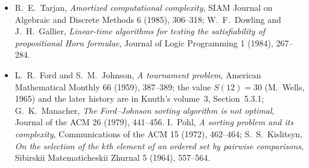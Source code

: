 \begin{itemize}
source of our presentation of the master theorem and of the dynamic array.
\item R.~E.~Tarjan, \emph{Amortized computational complexity}, SIAM Journal on Algebraic and Discrete Methods 6 (1985), 306--318;
W.~F.~Dowling and J.~H.~Gallier, \emph{Linear-time algorithms for testing the satisfiability of propositional Horn formulae}, Journal of Logic
Programming 1 (1984), 267--284.
\item L.~R.~Ford and S.~M.~Johnson, \emph{A tournament problem}, American Mathematical Monthly 66 (1959), 387--389; the value $S(12)=30$ (M.~Wells, 1965)
and the later history are in Knuth's volume~3, Section~5.3.1; G.~K.~Manacher, \emph{The Ford--Johnson sorting algorithm is not optimal},
Journal of the ACM 26 (1979), 441--456. I.~Pohl, \emph{A sorting problem and its complexity}, Communications of the ACM 15 (1972), 462--464;
S.~S.~Kislitsyn, \emph{On the selection of the $k$th element of an ordered set by pairwise comparisons}, Sibirskii Matematicheskii Zhurnal 5 (1964),
557--564.
\end{itemize}
